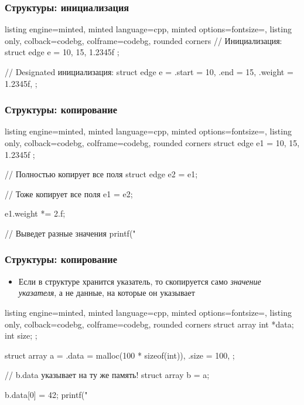 \documentclass[10pt]{beamer}
\begin{document}
\begin{frame}[fragile]
\frametitle{Структуры: инициализация}
\begin{tcblisting}{listing engine=minted, minted language=cpp, minted options={fontsize=\scriptsize}, listing only, colback=codebg, colframe=codebg, rounded corners}
// Инициализация:
struct edge e = { 10, 15, 1.2345f };

// Designated инициализация:
struct edge e = {
  .start = 10,
  .end = 15,
  .weight = 1.2345f,
};
\end{tcblisting}
\end{frame}

\begin{frame}[fragile]
\frametitle{Структуры: копирование}
\begin{tcblisting}{listing engine=minted, minted language=cpp, minted options={fontsize=\scriptsize}, listing only, colback=codebg, colframe=codebg, rounded corners}
struct edge e1 = { 10, 15, 1.2345f };

// Полностью копирует все поля
struct edge e2 = e1;

// Тоже копирует все поля
e1 = e2;

e1.weight *= 2.f;

// Выведет разные значения
printf("%
\end{tcblisting}
\end{frame}

\begin{frame}[fragile]
\frametitle{Структуры: копирование}
\begin{itemize}
\item Если в структуре хранится указатель, то скопируется само \textit{значение указателя}, а не данные, на которые он указывает
\end{itemize}
\begin{tcblisting}{listing engine=minted, minted language=cpp, minted options={fontsize=\scriptsize}, listing only, colback=codebg, colframe=codebg, rounded corners}
struct array {
  int *data;
  int size;
};

struct array a = {
  .data = malloc(100 * sizeof(int)),
  .size = 100,
};

// b.data указывает на ту же память!
struct array b = a;

b.data[0] = 42;
printf("%
\end{tcblisting}
\end{frame}
\end{document}
